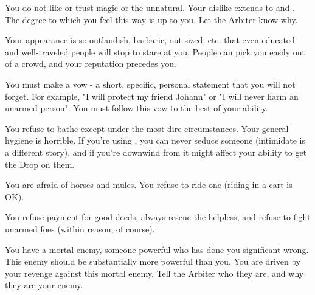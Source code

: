 \begin{multicols*}{2}
\newpage


    You do not like or trust magic or the unnatural. Your dislike extends to  and . The degree to which you feel this way is up to you. Let the Arbiter know why.


    Your appearance is so outlandish, barbaric, out-sized, etc. that even educated and well-traveled people will stop to stare at you. People can pick you easily out of a crowd, and your reputation precedes you.

  
    You must make a vow - a short, specific, personal statement that you will not forget. For example, "I will protect my friend Johann" or "I will never harm an unarmed person". You must follow this vow to the best of your ability.


    You refuse to bathe except under the most dire circumstances. Your general hygiene is horrible. If you're using , you can never seduce someone (intimidate is a different story), and if you're downwind from  it might affect your ability to get the Drop on them.


    You are afraid of horses and mules. You refuse to ride one (riding in a cart is OK).



    You refuse payment for good deeds, always rescue the helpless, and refuse to fight unarmed foes (within reason, of course). 


    You have a mortal enemy, someone powerful who has done you significant wrong. This enemy should be substantially more powerful than you. You are driven by your revenge against this mortal enemy. Tell the Arbiter who they are, and why they are your enemy.



\end{multicols*}
